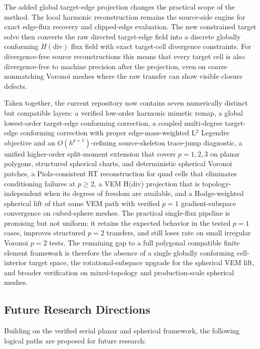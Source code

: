 \documentclass[11pt]{article}
\begin{document}
The added global target-edge projection changes the practical scope of the
method.  The local harmonic reconstruction remains the source-side engine for
exact edge-flux recovery and clipped-edge evaluation.  The new constrained
target solve then converts the raw directed target-edge field into a discrete
globally conforming \(H(\mathrm{div})\) flux field with exact target-cell
divergence constraints.  For divergence-free source reconstructions this means
that every target cell is also divergence-free to machine precision after the
projection, even on coarse nonmatching Voronoi meshes where the raw transfer can
show visible closure defects.

Taken together, the current repository now contains seven numerically distinct
but compatible layers: a verified low-order harmonic mimetic remap, a global
lowest-order target-edge conforming correction, a coupled multi-degree
target-edge conforming correction with proper edge-mass-weighted L\(^2\)
Legendre objective and an \(O(h^{p+1})\)-refining source-skeleton trace-jump
diagnostic, a unified higher-order split-moment extension that covers
\(p=1,2,3\) on planar polygons, structured spherical charts, and
deterministic spherical Voronoi patches, a Piola-consistent RT reconstruction
for quad cells that eliminates conditioning failures at \(p\ge2\), a VEM
H(div) projection that is topology-independent when its degrees of freedom are
available, and a Hodge-weighted spherical lift of that same VEM path with
verified \(p=1\) gradient-subspace convergence on cubed-sphere meshes.  The
practical single-flux pipeline is promising but not uniform: it retains the
expected behavior in the tested \(p=1\) cases, improves structured \(p=2\)
transfers, and still loses rate on small irregular Voronoi \(p=2\) tests.  The
remaining gap to a full polygonal compatible finite element framework is
therefore the absence of a single globally conforming cell-interior target
space, the rotational-subspace upgrade for the spherical VEM lift, and broader
verification on mixed-topology and production-scale spherical meshes.

\subsection*{Future Research Directions}
Building on the verified serial planar and spherical framework, the following
logical paths are proposed for future research:
\end{document}
